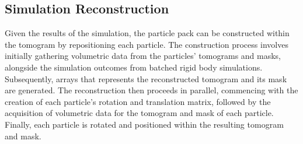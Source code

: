 \documentclass[preprint,12pt]{elsarticle}
\begin{document}
\subsection{Simulation Reconstruction}
Given the results of the simulation, the particle pack can be constructed within the tomogram by repositioning each particle. 
The construction process involves initially gathering volumetric data from the particles' tomograms and masks, alongside the simulation outcomes from batched rigid body simulations. 
Subsequently, arrays that represents the reconstructed tomogram and its mask are generated. 
The reconstruction then proceeds in parallel, commencing with the creation of each particle's rotation and translation matrix, followed by the acquisition of volumetric data for the tomogram and mask of each particle. 
Finally, each particle is rotated and positioned within the resulting tomogram and mask.
\end{document}
